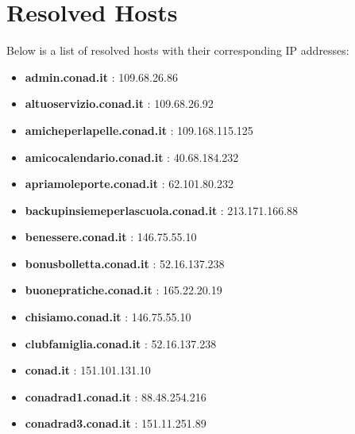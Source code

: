 \documentclass{article}
\begin{document}
\clearpage

\section{Resolved Hosts}

Below is a list of resolved hosts with their corresponding IP addresses:

\begin{itemize}
    
        
            \item \textbf{ admin.conad.it }: 109.68.26.86
        
            \item \textbf{ altuoservizio.conad.it }: 109.68.26.92
        
            \item \textbf{ amicheperlapelle.conad.it }: 109.168.115.125
        
            \item \textbf{ amicocalendario.conad.it }: 40.68.184.232
        
            \item \textbf{ apriamoleporte.conad.it }: 62.101.80.232
        
            \item \textbf{ backupinsiemeperlascuola.conad.it }: 213.171.166.88
        
            \item \textbf{ benessere.conad.it }: 146.75.55.10
        
            \item \textbf{ bonusbolletta.conad.it }: 52.16.137.238
        
            \item \textbf{ buonepratiche.conad.it }: 165.22.20.19
        
            \item \textbf{ chisiamo.conad.it }: 146.75.55.10
        
            \item \textbf{ clubfamiglia.conad.it }: 52.16.137.238
        
            \item \textbf{ conad.it }: 151.101.131.10
        
            \item \textbf{ conadrad1.conad.it }: 88.48.254.216
        
            \item \textbf{ conadrad3.conad.it }: 151.11.251.89
        

\end{itemize}
\end{document}
